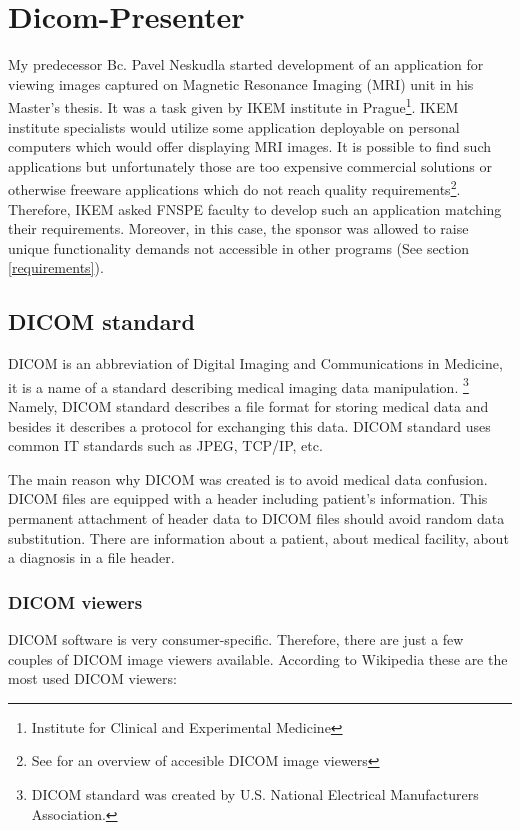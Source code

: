 \chapter{Dicom-Presenter}
\vspace{-10mm}
My predecessor Bc. Pavel Neskudla started development of an application for viewing images captured on Magnetic Resonance Imaging (MRI) unit in his Master's thesis\cite{neskudla}. It was a task given by IKEM institute in Prague\footnote{Institute for Clinical and Experimental Medicine}. IKEM institute specialists would utilize some application deployable on personal computers which would offer displaying MRI images. It is possible to find such applications but unfortunately those are too expensive commercial solutions or otherwise freeware applications which do not reach quality requirements\footnote{See \cite[page~9]{flaska_bc} for an overview of accesible DICOM image viewers}. Therefore, IKEM asked FNSPE faculty to develop such an application matching their requirements. Moreover, in this case, the sponsor was allowed to raise unique functionality demands not accessible in other programs (See section \ref{requirements}).

\section{DICOM standard}

DICOM is an abbreviation of Digital Imaging and Communications in Medicine, it is a name of a standard describing medical imaging data manipulation. \footnote{DICOM standard was created by  U.S. National Electrical Manufacturers Association\cite{nema}.} Namely, DICOM standard describes a file format for storing medical data and besides it describes a protocol for exchanging this data. DICOM standard uses common IT standards such as JPEG, TCP/IP, etc.

The main reason why DICOM was created is to avoid medical data confusion. DICOM files are equipped with a header including patient's information. This permanent attachment of header data to DICOM files should avoid random data substitution. There are information about a patient, about medical facility, about a diagnosis in a file header.

\subsection{DICOM viewers}
\label{viewers}
DICOM software is very consumer-specific. Therefore, there are just a few couples of DICOM image viewers available. According to Wikipedia these are the most used DICOM viewers:

